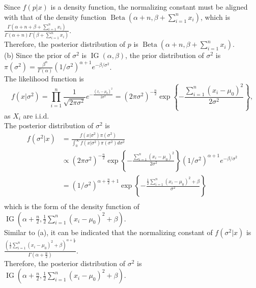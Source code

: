\documentclass[UTF8]{ctexart}
\begin{document}
Since $f(p|x)$ is a density function, the normalizing constant must be aligned with that of the density function $\operatorname{Beta}(\alpha+n, \beta+\sum\limits_{i=1}^{n} x_i)$, 
which is $\frac{\Gamma(\alpha+n+\beta+\sum_{i=1}^{n} x_i)}{\Gamma(\alpha+n) \Gamma(\beta+\sum_{i=1}^{n} x_i)}$.\\
Therefore, the posterior distribution of $p$ is $\operatorname{Beta}(\alpha+n, \beta+\sum\limits_{i=1}^{n} x_i)$.\\
(b) Since the prior of $\sigma^2$ is $\operatorname{IG}(\alpha, \beta)$, the prior distribution of $\sigma^2$ is $\pi(\sigma^2)=\frac{\beta^\alpha}{\Gamma(\alpha)}(1 / \sigma^2)^{\alpha+1} e^{-\beta / \sigma^2}$.\\
The likelihood function is 
$$f(x|\sigma^2)=\prod_{i=1}^{n} \frac{1}{\sqrt{2\pi\sigma^2}}e^{-\frac{(x_i-\mu_0)^2}{2\sigma^2}}=(2\pi\sigma^2)^{-\frac{n}{2}}\exp \left \{-\frac{\sum_{i=1}^{n}(x_i-\mu_0)^2}{2\sigma^2}\right \},$$
as $X_i$ are i.i.d.\\
The posterior distribution of $\sigma^2$ is
\begin{equation*}
    \begin{aligned}
        f(\sigma^2|x)&=\frac{f(x|\sigma^2)\pi(\sigma^2)}{\int_{0}^{\infty}f(x|\sigma^2)\pi(\sigma^2)d\sigma^2}\\
        & \propto (2\pi\sigma^2)^{-\frac{n}{2}}\exp \left \{-\frac{\sum_{i=1}^{n}(x_i-\mu_0)^2}{2\sigma^2}\right \}(1 / \sigma^2)^{\alpha+1} e^{-\beta / \sigma^2}\\
        & = (1 / \sigma^2)^{\alpha+\frac{n}{2}+1} \exp \left \{-\frac{\frac{1}{2}\sum_{i=1}^{n}(x_i-\mu_0)^2 + \beta}{\sigma^2}\right \}\\
    \end{aligned}
\end{equation*}
which is the form of the density function of $\operatorname{IG}(\alpha+\frac{n}{2}, \frac{1}{2}\sum_{i=1}^{n}(x_i-\mu_0)^2 + \beta)$.\\
Similar to (a), it can be indicated that the normalizing constant of $f(\sigma^2|x)$ is $\frac{\left (\frac{1}{2}\sum_{i=1}^{n}(x_i-\mu_0)^2 + \beta \right )^{\alpha+\frac{n}{2}}}{\Gamma(\alpha+\frac{n}{2})}$.\\
Therefore, the posterior distribution of $\sigma^2$ is $\operatorname{IG}(\alpha+\frac{n}{2}, \frac{1}{2}\sum_{i=1}^{n}(x_i-\mu_0)^2 + \beta)$.\\
\end{document}
